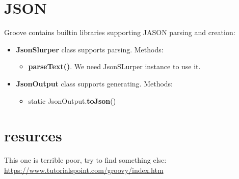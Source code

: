 \documentclass{report}
\begin{document}
 
 
\part{JSON}
Groove contains builtin libraries supporting JASON parsing and creation:
\begin{itemize}
  \item \textbf{JsonSlurper} class supports parsing. Methods:
  \begin{itemize}
    \item \textbf{parseText()}. We need JsonSLurper instance to use it.
  \end{itemize}
  
  \item \textbf{JsonOutput} class supports generating. Methods:
  \begin{itemize}
    \item static JsonOutput.\textbf{toJson}()
  \end{itemize}
\end{itemize}



\part{resurces}



This one is terrible poor, try to find something else:\\
\url{https://www.tutorialspoint.com/groovy/index.htm}
\end{document}
